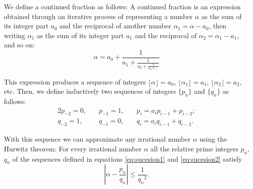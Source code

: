 \documentclass[pre,amsmath,amssymb, twocolumn, showpacs]{revtex4-1}
\begin{document}
We define a continued fraction as follows:
A continued fraction is an expression obtained through an iterative process of representing a number $\alpha$ as the sum of its integer part $a_0$ and the reciprocal of another number $\alpha_1=\alpha-a_0$, then writing $\alpha_1$ as the sum of its integer part $a_1$ and the reciprocal of $\alpha_2=\alpha_1-a_1$, and so on:
\begin{equation*}
  \alpha = a_0 + \frac{1}{\displaystyle a_1
          + \frac{1}{\displaystyle a_2
          + \frac{1}{\displaystyle a_3 + \dots}}}
\end{equation*}

This expression produces a sequence of integers $\lfloor \alpha \rfloor=a_0$, $\lfloor \alpha_1 \rfloor=a_1$, $\lfloor \alpha_2 \rfloor=a_2$, etc. 
Then, we define inductively two sequences of integers $\{ p_n\}$ and $\{ q_n\}$ as follows:
%
\begin{alignat}{2}
p_{-2} = 0,  &\quad p_{-1} = 1,  &\quad p_i=a_i p_{i-1}+p_{i-2};
\label{eq:sucesion1}
\\ 
q_{-2} = 1,  &\quad q_{-1} = 0,  &\quad q_i=a_i q_{i-1}+q_{i-2}.
\label{eq:sucesion2}
\end{alignat}

With this sequence we can approximate any irrational number $\alpha$ using the Hurwitz theorem:
For every irrational number $\alpha$ all the relative prime integers $p_n$, $q_n$ of the sequences defined in equations \ref{eq:sucesion1} and \ref{eq:sucesion2} satisfy 
\begin{equation}
|\alpha- \frac{p_n}{q_n}|\leq  \frac{1}{{q_n}^2}.
\end{equation}





\end{document}
